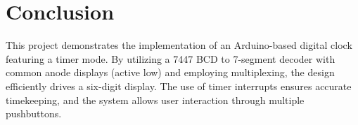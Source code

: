 \documentclass[a4paper,12pt]{article}
\begin{document}
\section{Conclusion}
This project demonstrates the implementation of an Arduino-based digital clock featuring a timer mode. By utilizing a 7447 BCD to 7-segment decoder with common anode displays (active low) and employing multiplexing, the design efficiently drives a six-digit display. The use of timer interrupts ensures accurate timekeeping, and the system allows user interaction through multiple pushbuttons.
\end{document}
